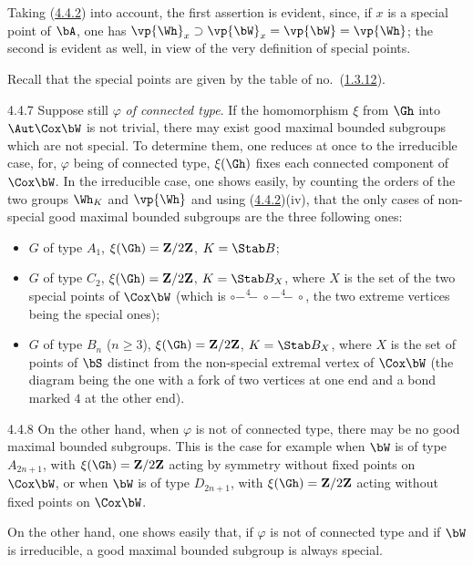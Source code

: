 \documentclass[12pt,a4paper,oneside,english]{smfart}
\makeatletter
\newcommand{\btanchor}[1]{\leavevmode\Hy@raisedlink{\hypertarget{bt:#1}{}}}
\newcommand{\btref}[1]{\hyperlink{bt:#1}{#1}}
\theoremstyle{definition}
\theoremstyle{bt}
\makeatother
\begin{document}
Taking (\btref{4.4.2}) into account, the first assertion is evident, since, if $x$ is
a special point of $\bA$, one has
$\vp{\Wh}_{x} \supset \vp{\bW}_{x} = \vp{\bW} = \vp{\Wh}$; the second is
evident as well, in view of the very definition of special points.

Recall that the special points are given by the table of no.~(\btref{1.3.12}).

\num{4.4.7}\btanchor{4.4.7}
Suppose still $\varphi$ \emph{of connected type}. If the homomorphism $\xi$
from $\Gh$ into $\Aut\Cox\bW$ is not trivial, there may exist good maximal
bounded subgroups which are not special. To determine them, one reduces at
once to the irreducible case, for, $\varphi$ being of connected type,
$\xi(\Gh)$ fixes each connected component of $\Cox\bW$. In the irreducible
case, one shows easily, by counting the orders of the two groups $\Wh_{K}$
and $\vp{\Wh}$ and using (\btref{4.4.2})(iv), that the only cases of non-special good
maximal bounded subgroups are the three following ones:
\begin{itemize}
\item $G$ of type $A_1$, \quad $\xi(\Gh) = \mathbf{Z}/2\mathbf{Z}$, \quad
$K = \Stab B$;
\item $G$ of type $C_2$, \quad $\xi(\Gh) = \mathbf{Z}/2\mathbf{Z}$, \quad
$K = \Stab B_X$, where $X$ is the set of the two special points of $\Cox\bW$
(which is $\circ\!\overset{4}{-\!\!-}\!\circ\!\overset{4}{-\!\!-}\!\circ$,
the two extreme vertices being the special ones);
\item $G$ of type $B_n$ ($n\geqslant 3$), \quad
$\xi(\Gh) = \mathbf{Z}/2\mathbf{Z}$, \quad $K = \Stab B_X$, where $X$ is the
set of points of $\bS$ distinct from the non-special extremal vertex of
$\Cox\bW$ (the diagram being the one with a fork of two vertices at one end
and a bond marked $4$ at the other end).
\end{itemize}

\num{4.4.8}\btanchor{4.4.8}
On the other hand, when $\varphi$ is not of connected type, there may be no
good maximal bounded subgroups. This is the case for example when $\bW$ is of
type $A_{2n+1}$, with $\xi(\Gh) = \mathbf{Z}/2\mathbf{Z}$ acting by symmetry
without fixed points on $\Cox\bW$, or when $\bW$ is of type $D_{2n+1}$, with
$\xi(\Gh) = \mathbf{Z}/2\mathbf{Z}$ acting without fixed points on
$\Cox\bW$.

On the other hand, one shows easily that, if $\varphi$ is not of connected
type and if $\bW$ is irreducible, a good maximal bounded subgroup is always
special.
\end{document}
